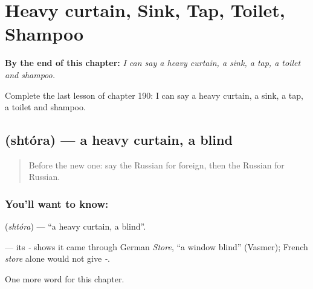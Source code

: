 
\chapter{Heavy curtain, Sink, Tap, Toilet, Shampoo}
\label{ch:ru-heavy-curtain-sink-tap-toilet-shampoo}

\begin{chapteropening}
\textbf{By the end of this chapter:} \emph{I can say a heavy curtain, a sink, a tap, a toilet and shampoo.}

Complete the last lesson of chapter 190: I can say a heavy curtain, a sink, a tap, a toilet and shampoo.
\end{chapteropening}

\section[\texorpdfstring{\ru{штора} (shtóra)}{штора (shtóra)}]{ (shtóra) — a heavy curtain, a blind}

\label{lesson:RU-C190-shtora}



\begin{quote}
Before the new one: say the Russian for foreign, then the Russian for Russian.
\end{quote}

\subsection*{You'll want to know: }
\textbf{} (\emph{shtóra}) — \textquotedblleft{}a heavy curtain, a blind\textquotedblright{}.

\begin{cousinweb}
\textbf{} — its \emph{-} shows it came through German \emph{Store}, \textquotedblleft{}a window blind\textquotedblright{} (Vasmer); French \emph{store} alone would not give \emph{-}.
\end{cousinweb}

\begin{grammarlens}[title={What you've built}]
One more word for this chapter.
\end{grammarlens}

